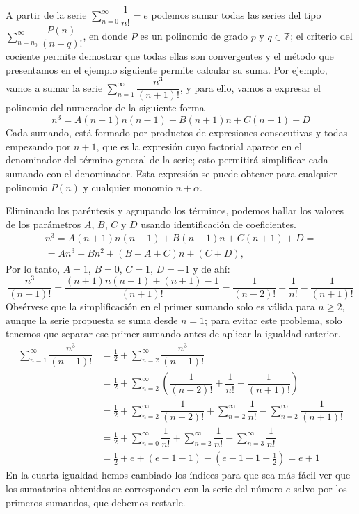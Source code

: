 \begin{ejemplo}\label{ej:pnfact}
A partir de la serie $\displaystyle\sum_{n=0}^\infty  \dfrac1{n!}=e$ podemos sumar todas las series del tipo
$\displaystyle\sum_{n=n_0}^\infty\dfrac{P(n)}{(n+q)!}$, en donde $P$ es un polinomio de grado $p$ y $q\in\mathbb{Z}$;
el criterio del cociente permite demostrar que todas ellas son convergentes y el método que presentamos en el ejemplo siguiente permite calcular su suma.
Por ejemplo, vamos a sumar la serie $\displaystyle\sum_{n=1}^\infty  \dfrac{n^3}{(n+1)!}$, y para ello, vamos a expresar el polinomio del numerador de la siguiente forma
\[
n^3 = A(n+1)n(n-1)+B(n+1)n+C(n+1)+\mathit{D}
\]
Cada sumando, está formado por productos de expresiones consecutivas y todas empezando por $n+1$, que es la expresión cuyo factorial aparece en el denominador del término general de la serie;
esto permitirá simplificar cada sumando con el denominador.
Esta expresión se puede obtener para cualquier polinomio $P(n)$ y cualquier monomio $n+\alpha$.

Eliminando los paréntesis y agrupando los términos, podemos hallar los valores de los parámetros $A$, $B$, $C$ y $\mathit D$ usando identificación de coeficientes.
\begin{multline*}
n^3 = A(n+1)n(n-1)+B(n+1)n+C(n+1)+\mathit{D}=\\
= An^3+Bn^2+(B-A+C)n+(C+\mathit{D}),
\end{multline*}
Por lo tanto, $A=1$, $B=0$, $C=1$, $\mathit{D}=-1$ y de ahí:
\[
\dfrac{n^3}{(n+1)!} = \dfrac{(n+1)n(n-1)+(n+1)-1}{(n+1)!}=
\dfrac1{(n-2)!}+\dfrac1{n!}-\dfrac1{(n+1)!}
\]
Obsérvese que la simplificación en el primer sumando solo es válida para $n\ge 2$, aunque la serie propuesta se suma desde $n=1$;
para evitar este problema, solo tenemos que separar ese primer sumando antes de aplicar la igualdad anterior.
\begin{align*}
\displaystyle\sum_{n=1}^\infty  \dfrac{n^3}{(n+1)!} &= \frac12+\displaystyle\sum_{n=2}^\infty  \dfrac{n^3}{(n+1)!} \\
 &= \frac12+\displaystyle\sum_{n=2}^\infty  \left(\dfrac1{(n-2)!}+\dfrac1{n!}-\dfrac1{(n+1)!}\right) \\
 &= \frac12+\displaystyle\sum_{n=2}^\infty  \dfrac1{(n-2)!}+\displaystyle\sum_{n=2}^\infty  \dfrac1{n!}-\displaystyle\sum_{n=2}^\infty  \dfrac1{(n+1)!}\\
 &= \frac12+\displaystyle\sum_{n=0}^\infty  \dfrac1{n!}+\displaystyle\sum_{n=2}^\infty  \dfrac1{n!}-\sum_{n=3}^\infty\dfrac1{n!}\\
 &= \frac12+e+(e-1-1)-(e-1-1-\frac12) =e+1
\end{align*}
En la cuarta igualdad hemos cambiado los índices para que sea más fácil ver que los sumatorios obtenidos se corresponden con la serie del número $e$ salvo por los primeros sumandos, que debemos restarle.\fej
\end{ejemplo}
